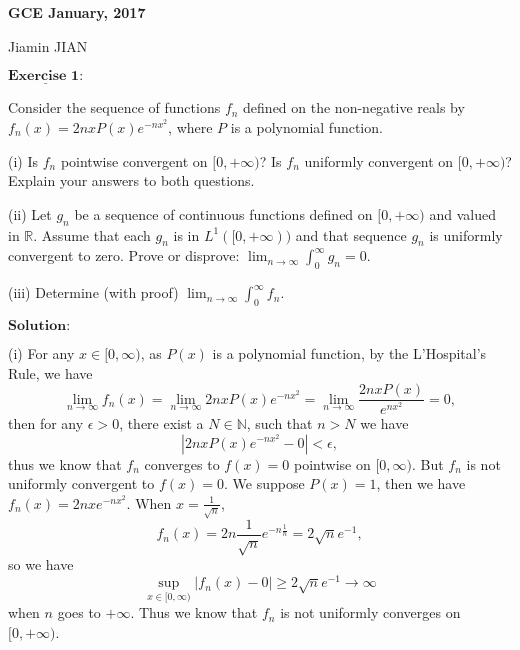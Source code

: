 \documentclass[12pt,a4paper]{ctexart}
\begin{document}
\begin{center}
\textbf{ GCE January, 2017}
\vspace{8pt}

Jiamin JIAN
\end{center}

\vspace{12pt}


$\underline{\textbf{Exercise 1:}}$

Consider the sequence of functions $f_{n}$ defined on the non-negative reals by $f_{n} (x) = 2 n x P(x) e^{-n x^{2}}$, where $P$ is a polynomial function.

(i) Is $f_{n}$ pointwise convergent on $[0, + \infty)$? Is $f_{n}$ uniformly convergent on $[0, + \infty)$? Explain your answers to both questions.

(ii) Let $g_{n}$ be a sequence of continuous functions defined on $[0, + \infty)$ and valued in $\mathbb{R}$. Assume that each $g_{n}$ is in $L^{1}([0, + \infty))$ and that sequence $g_{n}$ is uniformly convergent to zero. Prove or disprove: $\lim_{n \to \infty} \int_{0}^{\infty} g_{n} = 0$. 

(iii) Determine (with proof) $\lim_{n \to \infty} \int_{0}^{\infty}  f_{n}$.
  
\vspace{8pt}

$\textbf{Solution:}$

(i) For any $x \in [0, \infty)$, as $P(x)$ is a polynomial function, by the L'Hospital's Rule, we have
\begin{equation*}
    \lim_{n \to \infty} f_{n} (x) = \lim_{n \to \infty} 2 n x P(x) e^{-n x^{2}} = \lim_{n \to \infty} \frac{2 n x P(x)}{e^{n x^{2}}} = 0,
\end{equation*}
then for any $\epsilon > 0$, there exist a $N \in \mathbb{N}$, such that $n > N$ we have 
\begin{equation*}
    |2 n x P(x) e^{- n x^{2}} - 0| < \epsilon,
\end{equation*}
thus we know that $f_{n}$ converges to $f(x) = 0$ pointwise on $[0, \infty)$. But $f_{n}$ is not uniformly convergent to $f(x) = 0$. We suppose $P(x) = 1$, then we have $f_{n}(x) = 2 n x e^{-n x^{2}} $. When $x = \frac{1}{\sqrt{n}}$, 
\begin{equation*}
    f_{n} (x) = 2 n \frac{1}{\sqrt{n}} e^{- n \frac{1}{n}} = 2 \sqrt{n} e^{-1},
\end{equation*}
so we have
\begin{equation*}
    \sup_{x \in [0, \infty)} |f_{n} (x) - 0| \geq 2 \sqrt{n} e^{-1} \to \infty
\end{equation*}
when $n$ goes to $+ \infty$. Thus we know that $f_{n}$ is not uniformly converges on $[0, + \infty)$. 
\end{document}
